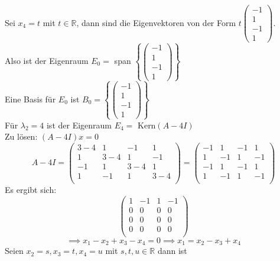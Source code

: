 \documentclass{article}
\begin{document}
Sei $x_4 = t$ mit $t \in \mathbb{R}$, dann sind die Eigenvektoren von der Form $t \begin{pmatrix}
    -1 \\ 1 \\ -1 \\ 1 
\end{pmatrix}$. \\
\newline
Also ist der Eigenraum $E_0 =$ span $\left\{ \begin{pmatrix}
    -1 \\ 1 \\ -1 \\ 1
\end{pmatrix} \right\}$ \\
Eine Basis für $E_0$ ist $B_0 = \left\{ \begin{pmatrix}
    -1 \\ 1 \\ -1 \\ 1
\end{pmatrix} \right\}$ \\
\newline
Für $\lambda_2 = 4$ ist der Eigenraum $E_4 =$ Kern$(A-4I)$ \\
Zu lösen: $(A-4I)x = 0$
\[A - 4I = \begin{pmatrix}
    3-4 & 1 & -1 & 1 \\
    1 & 3-4 & 1 & -1 \\
    -1 & 1 & 3-4 & 1 \\
    1 & -1 & 1 & 3-4 \\
\end{pmatrix} = \begin{pmatrix}
    -1 & 1 & -1 & 1 \\ 
    1 & -1 & 1 & -1 \\ 
    -1 & 1 & -1 & 1 \\ 
    1 & -1 & 1 & -1 \\ 
\end{pmatrix}\]
Es ergibt sich: 
\[\begin{pmatrix}
    1 & -1 & 1 & -1 \\
    0 & 0 & 0 & 0 \\
    0 & 0 & 0 & 0 \\
    0 & 0 & 0 & 0 \\
\end{pmatrix}\]
\[\implies x_1 - x_2 + x_3 - x_4 = 0 \implies x_1 = x_2 - x_3 + x_4\]
Seien $x_2 = s, x_3 = t, x_4 = u$ mit $s,t,u \in \mathbb{R}$ dann ist
\end{document}

